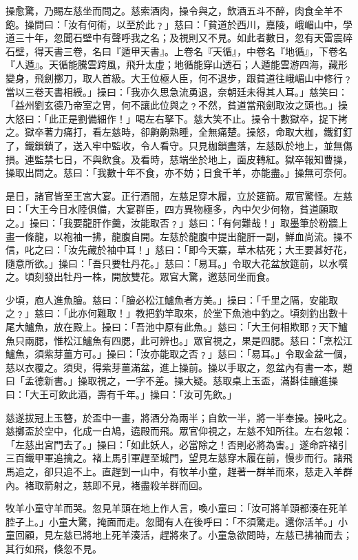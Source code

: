 操愈驚，乃賜左慈坐而問之。慈索酒肉，操令與之，飲酒五斗不醉，肉食全羊不飽。操問曰：「汝有何術，以至於此﹖」慈曰：「貧道於西川，嘉陵，峨嵋山中，學道三十年，忽聞石壁中有聲呼我之名；及視則又不見。如此者數日，忽有天雷震碎石壁，得天書三卷，名曰『遁甲天書』。上卷名『天循』，中卷名『地循』，下卷名『人遁』。天循能騰雲跨風，飛升太虛；地循能穿山透石；人遁能雲游四海，藏形變身，飛劍擲刀，取人首級。大王位極人臣，何不退步，跟貧道往峨嵋山中修行﹖當以三卷天書相綬。」操曰：「我亦久思急流勇退，奈朝廷未得其人耳。」慈笑曰：「益州劉玄德乃帝室之冑，何不讓此位與之﹖不然，貧道當飛劍取汝之頭也。」操大怒曰：「此正是劉備細作！」喝左右拏下。慈大笑不止。操令十數獄卒，捉下拷之。獄卒著力痛打，看左慈時，卻齁齁熟睡，全無痛楚。操怒，命取大枷，鐵釘釘了，鐵鎖鎖了，送入牢中監收，令人看守。只見枷鎖盡落，左慈臥於地上，並無傷損。連監禁七日，不與飲食。及看時，慈端坐於地上，面皮轉紅。獄卒報知曹操，操取出問之。慈曰：「我數十年不食，亦不妨；日食千羊，亦能盡。」操無可奈何。

是日，諸官皆至王宮大宴。正行酒間，左慈足穿木履，立於筵箭。眾官驚怪。左慈曰：「大王今日水陸俱備，大宴群臣，四方異物極多，內中欠少何物，貧道願取之。」操曰：「我要龍肝作羹，汝能取否﹖」慈曰：「有何難哉！」取墨筆於粉牆上畫一條龍，以袍袖一拂，龍腹自開。左慈於龍腹中提出龍肝一副，鮮血尚流。操不信，叱之曰：「汝先藏於袖中耳！」慈曰：「即今天寨，草木枯死；大王要甚好花，隨意所欲。」操曰：「吾只要牡丹花。」慈曰：「易耳。」令取大花盆放筵前，以水噀之。頃刻發出牡丹一株，開放雙花。眾官大驚，邀慈同坐而食。

少頃，庖人進魚膾。慈曰：「膾必松江鱸魚者方美。」操曰：「千里之隔，安能取之﹖」慈曰：「此亦何難取！」教把釣竿取來，於堂下魚池中釣之。頃刻釣出數十尾大鱸魚，放在殿上。操曰：「吾池中原有此魚。」慈曰：「大王何相欺耶﹖天下鱸魚只兩腮，惟松江鱸魚有四腮，此可辨也。」眾官視之，果是四腮。慈曰：「烹松江鱸魚，須紫芽薑方可。」操曰：「汝亦能取之否﹖」慈曰：「易耳。」令取金盆一個，慈以衣覆之。須臾，得紫芽薑滿盆，進上操前。操以手取之，忽盆內有書一本，題曰「孟德新書。」操取視之，一字不差。操大疑。慈取桌上玉盃，滿斟佳釀進操曰：「大王可飲此酒，壽有千年。」操曰：「汝可先飲。」

慈遂拔冠上玉簪，於盃中一畫，將酒分為兩半；自飲一半，將一半奉操。操叱之。慈擲盃於空中，化成一白鳩，遶殿而飛。眾官仰視之，左慈不知所往。左右忽報：「左慈出宮門去了。」操曰：「如此妖人，必當除之！否則必將為害。」遂命許褚引三百鐵甲軍追擒之。褚上馬引軍趕至城門，望見左慈穿木履在前，慢步而行。諸飛馬追之，卻只追不上。直趕到一山中，有牧羊小童，趕著一群羊而來，慈走入羊群內。褚取箭射之，慈即不見，褚盡殺羊群而回。

牧羊小童守羊而哭。忽見羊頭在地上作人言，喚小童曰：「汝可將羊頭都湊在死羊腔子上。」小童大驚，掩面而走。忽聞有人在後呼曰：「不須驚走。還你活羊。」小童回顧，見左慈已將地上死羊湊活，趕將來了。小童急欲問時，左慈已拂袖而去；其行如飛，倏忽不見。

